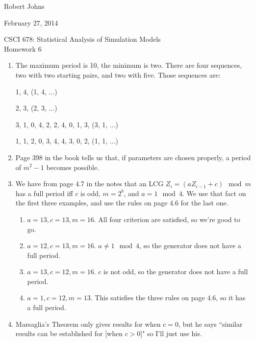 \documentclass[11pt]{article} %
\begin{document}
\hfill Robert Johns

\hfill February 27, 2014

\begin{center} {\Large CSCI 678: Statistical Analysis of Simulation Models}\\{\large Homework 6}\end{center}

\begin{enumerate}

\item The maximum period is 10, the minimum is two. There are four sequences, two with two starting pairs, and two with five.  Those sequences are:

1, 4, (1, 4, ...)

2, 3, (2, 3, ...)

3, 1, 0, 4, 2, 2, 4, 0, 1, 3, (3, 1, ...)

1, 1, 2, 0, 3, 4, 4, 3, 0, 2, (1, 1, ...)

\item Page 398 in the book tells us that, if parameters are chosen properly, a period of $m^2-1$ becomes possible.  

\item We have from page 4.7 in the notes that an LCG $Z_i = (aZ_{i-1}+c)\mod m$ has a full period iff $c$ is odd, $m = 2^b$, and $a = 1\mod 4$.  We use that fact on the first three examples, and use the rules on page 4.6 for the last one.

\begin{enumerate}

\item $a = 13, c = 13, m = 16$.  All four criterion are satisfied, so we're good to go.

\item $a = 12, c = 13, m = 16$. $a \not= 1\mod 4$, so the generator does not have a full period.

\item $a = 13, c = 12, m = 16$.  $c$ is not odd, so the generator does not have a full period.

\item $a = 1, c = 12, m = 13$.  This satisfies the three rules on page 4.6, so it has a full period.

\end{enumerate}

\item Marsaglia's Theorem only gives results for when $c = 0$, but he says ``similar results can be established for [when $c > 0$]" so I'll just use his.


\end{enumerate}
\end{document}
